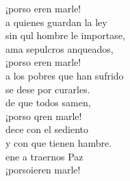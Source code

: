 \documentclass[12pt]{article}
\begin{document}
\begin{multicols*}{2}
\begin{cancion}
	¡porso eren marle!\\
	a quienes guardan la ley\\
	sin qul hombre le importase,\\
	ama sepulcros anqueados,\\
	¡porso eren marle!\\
	a los pobres que han sufrido\\
	se dese por curarles.\\
	de que todos samen,\\
	¡porso qren marle!\\
	dece con el sediento\\
	y con  que tienen hambre.\\
	ene a traernos  Paz\\
	¡porsoieren marle!\\
\end{cancion}%


\end{multicols*}
\end{document}
